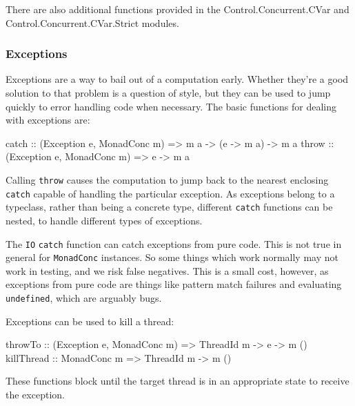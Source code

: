 There are also additional functions provided in the
Control\-.Concurrent\-.CVar and Control\-.Concurrent\-.CVar\-.Strict
modules.

\subsubsection{Exceptions}
\label{sec:abstraction-typeclass-excs}

Exceptions are a way to bail out of a computation early. Whether
they're a good solution to that problem is a question of style, but
they can be used to jump quickly to error handling code when
necessary. The basic functions for dealing with exceptions are:

\begin{haskellcode}
catch :: (Exception e, MonadConc m) => m a -> (e -> m a) -> m a
throw :: (Exception e, MonadConc m) => e -> m a
\end{haskellcode}

Calling \verb|throw| causes the computation to jump back to the
nearest enclosing \verb|catch| capable of handling the particular
exception. As exceptions belong to a typeclass, rather than being a
concrete type, different \verb|catch| functions can be nested, to
handle different types of exceptions.

\begin{departure}
  The \verb|IO| \verb|catch| function can catch exceptions from pure
  code. This is not true in general for \verb|MonadConc| instances.
  So some things which work normally may not work in testing, and we
  risk false negatives. This is a small cost, however, as exceptions
  from pure code are things like pattern match failures and evaluating
  \verb|undefined|, which are arguably bugs.
\end{departure}

Exceptions can be used to kill a thread:

\begin{haskellcode}
throwTo :: (Exception e, MonadConc m) => ThreadId m -> e -> m ()
killThread :: MonadConc m => ThreadId m -> m ()
\end{haskellcode}

These functions block until the target thread is in an appropriate
state to receive the exception.

